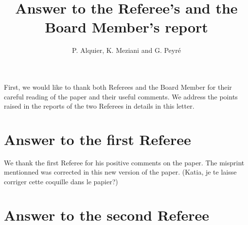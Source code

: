\documentclass[a4paper]{article}
\title{Answer to the Referee's and the Board Member's report}
\author{P. Alquier, K. Meziani and G. Peyr\'e}
\date{}
\begin{document}
\maketitle

First, we would like to thank both Referees and the Board Member
for their careful reading of the paper and their useful comments.
We address the points raised in the reports of the two Referees
in details in this letter.

\section*{Answer to the first Referee}

We thank the first Referee for his positive comments on the paper.
The misprint mentionned was corrected in this new version of the
paper. (Katia, je te laisse corriger cette coquille dans le papier?)

\section*{Answer to the second Referee}
\end{document}

